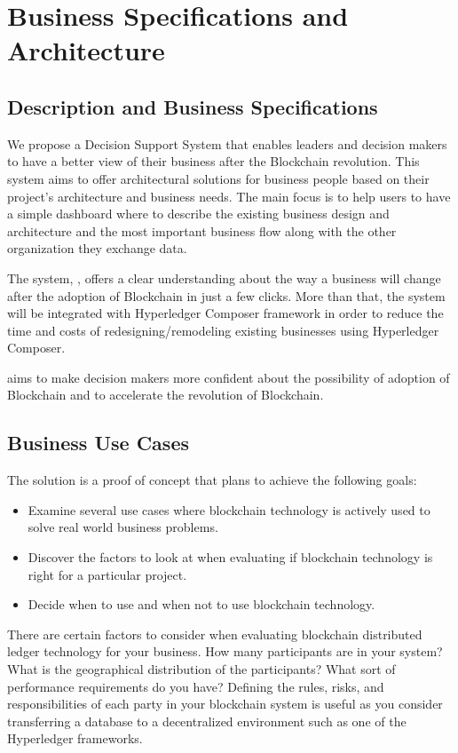 \chapter{Business Specifications and Architecture}
\label{chapter:chapter3}

\section{Description and Business Specifications}
\label{sub-sec:chapter3-section1}
We propose a Decision Support System that enables leaders and decision makers to have a better view of their business after the Blockchain revolution. This system aims to offer architectural solutions for business people based on their project’s architecture and business needs. The main focus is to help users to have a simple dashboard where to describe the existing business design and architecture and the most important business flow along with the other organization they exchange data. 

The system, \textbf{\project}, offers a clear understanding about the way a business will change after the adoption of Blockchain in just a few clicks. More than that, the system will be integrated with Hyperledger Composer framework in order to reduce the time and costs of redesigning/remodeling existing businesses using Hyperledger Composer. 

\textbf{\project} aims to make decision makers more confident about the possibility of adoption of Blockchain and to accelerate the revolution of Blockchain.

\section{Business Use Cases}
\label{sub-sec:chapter3-section2}
The solution is a proof of concept that plans to achieve the following goals:
\begin{itemize}
	\item Examine several use cases where blockchain technology is actively used to solve real world business problems.
	\item Discover the factors to look at when evaluating if blockchain technology is right for a particular project.
	\item Decide when to use and when not to use blockchain technology.
\end{itemize}

There are certain factors to consider when evaluating blockchain distributed ledger technology for your business. How many participants are in your system? What is the geographical distribution of the participants? What sort of performance requirements do you have? Defining the rules, risks, and responsibilities of each party in your blockchain system is useful as you consider transferring a database to a decentralized environment such as one of the Hyperledger frameworks.

